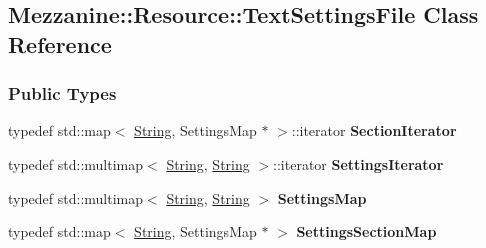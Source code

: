 \hypertarget{classMezzanine_1_1Resource_1_1TextSettingsFile}{
\subsection{Mezzanine::Resource::TextSettingsFile Class Reference}
\label{classMezzanine_1_1Resource_1_1TextSettingsFile}
}
\subsubsection*{Public Types}
\begin{DoxyCompactItemize}
\item 
\hypertarget{classMezzanine_1_1Resource_1_1TextSettingsFile_aa2709cbc85ea58c1a155270febd0ebfd}{
typedef std::map$<$ \hyperlink{namespaceMezzanine_acf9fcc130e6ebf08e3d8491aebcf1c86}{String}, SettingsMap $\ast$ $>$::iterator {\bfseries SectionIterator}}
\label{classMezzanine_1_1Resource_1_1TextSettingsFile_aa2709cbc85ea58c1a155270febd0ebfd}

\item 
\hypertarget{classMezzanine_1_1Resource_1_1TextSettingsFile_ae756712e9a9141bf51b9c92bfc1d1934}{
typedef std::multimap$<$ \hyperlink{namespaceMezzanine_acf9fcc130e6ebf08e3d8491aebcf1c86}{String}, \hyperlink{namespaceMezzanine_acf9fcc130e6ebf08e3d8491aebcf1c86}{String} $>$::iterator {\bfseries SettingsIterator}}
\label{classMezzanine_1_1Resource_1_1TextSettingsFile_ae756712e9a9141bf51b9c92bfc1d1934}

\item 
\hypertarget{classMezzanine_1_1Resource_1_1TextSettingsFile_a8f8b1c8d644ac1424a71004c31a565fd}{
typedef std::multimap$<$ \hyperlink{namespaceMezzanine_acf9fcc130e6ebf08e3d8491aebcf1c86}{String}, \hyperlink{namespaceMezzanine_acf9fcc130e6ebf08e3d8491aebcf1c86}{String} $>$ {\bfseries SettingsMap}}
\label{classMezzanine_1_1Resource_1_1TextSettingsFile_a8f8b1c8d644ac1424a71004c31a565fd}

\item 
\hypertarget{classMezzanine_1_1Resource_1_1TextSettingsFile_a8cbb2cec71b9818f66eae422f6936b4b}{
typedef std::map$<$ \hyperlink{namespaceMezzanine_acf9fcc130e6ebf08e3d8491aebcf1c86}{String}, SettingsMap $\ast$ $>$ {\bfseries SettingsSectionMap}}
\label{classMezzanine_1_1Resource_1_1TextSettingsFile_a8cbb2cec71b9818f66eae422f6936b4b}

\end{DoxyCompactItemize}
